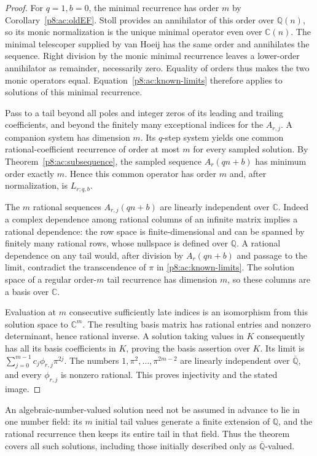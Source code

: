\documentclass[11pt,a4paper]{article}
\theoremstyle{definition}
\theoremstyle{remark}
\numberwithin{equation}{section}
\begin{document}
\begin{proof}
For $q=1,b=0$, the minimal recurrence has order $m$ by
Corollary~\ref{p8:ac:oldEF}. Stoll provides an annihilator of this order
over $\mathbb Q(n)$, so its monic normalization is the unique minimal
operator even over $\mathbb C(n)$. The minimal telescoper supplied
by van Hoeij has the same order and annihilates the sequence. Right
division by the monic minimal recurrence leaves a lower-order
annihilator as remainder, necessarily zero. Equality of orders thus
makes the two monic operators equal. Equation~\eqref{p8:ac:known-limits}
therefore applies to solutions of this minimal recurrence.

Pass to a tail beyond all poles and integer zeros of its leading
and trailing coefficients, and beyond the finitely many exceptional
indices for the $A_{r,j}$. A companion system has dimension $m$.
Its $q$-step system yields one common rational-coefficient recurrence
of order at most $m$ for every sampled solution. By
Theorem~\ref{p8:ac:subsequence}, the sampled sequence $A_r(qn+b)$
has minimum order exactly $m$. Hence this common operator has order
$m$ and, after normalization, is $L_{r;q,b}$.

The $m$ rational sequences $A_{r,j}(qn+b)$ are linearly independent
over $\mathbb C$. Indeed a complex dependence among rational
columns of an infinite matrix implies a rational dependence: the
row space is finite-dimensional and can be spanned by finitely many
rational rows, whose nullspace is defined over $\mathbb Q$.
A rational dependence on any tail would, after division by
$A_r(qn+b)$ and passage to the limit, contradict the transcendence
of $\pi$ in \eqref{p8:ac:known-limits}. The solution space of a regular
order-$m$ tail recurrence has dimension $m$, so these columns are a
basis over $\mathbb C$.

Evaluation at $m$ consecutive sufficiently late indices is an
isomorphism from this solution space to $\mathbb C^m$. The resulting
basis matrix has rational entries and nonzero determinant, hence
rational inverse. A solution taking values in $K$ consequently has
all its basis coefficients in $K$, proving the basis assertion over
$K$. Its limit is
$\sum_{j=0}^{m-1}c_j\phi_{r,j}\pi^{2j}$.
The numbers $1,\pi^2,\ldots,\pi^{2m-2}$ are linearly independent
over $\overline{\mathbb Q}$, and every $\phi_{r,j}$ is nonzero
rational. This proves injectivity and the stated image.
\end{proof}

An algebraic-number-valued solution need not be assumed in advance
to lie in one number field: its $m$ initial tail values generate a
finite extension of $\mathbb Q$, and the rational recurrence then
keeps its entire tail in that field. Thus the theorem covers all such
solutions, including those initially described only as
$\overline{\mathbb Q}$-valued.
\end{document}

